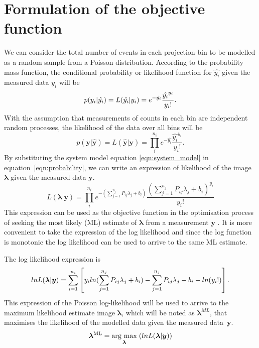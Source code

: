 \section{Formulation of the objective function}
We can consider the total number of events in each projection bin to be modelled as a random sample from a Poisson distribution. According to the probability mass function, the conditional probability or likelihood function for $\hat{y_i}$ given the measured data ${y_i}$ will be
\begin{equation}
p({y_i}|{\hat{y_i}}) = L({\hat{y_i}}|{y_i}) = e^{-\hat{y_i}} \frac{\hat{y_i}^{y_i}}{{y_i}!}  \\  .
\end{equation}
With the assumption that measurements of counts in each bin are independent random processes, the likelihood of the data over all bins will be
\begin{equation}
p(\bm{y}|\bm{\hat{y}}) = L(\bm{\hat{y}}|\bm{y}) = \prod_i^{n_i} e^{-\hat{y_i}} \frac{\hat{y_i}^{y_i}}{{y_i}!} . 
\label{eqn:probability}
\end{equation}
By substituting the system model equation \ref{eqn:system_model} in equation~\ref{eqn:probability}, we can write an expression of likelihood of the image $\bm{\lambda}$ given the measured data $\bm{y}$.
\begin{equation}
    L(\bm{\lambda}|\bm{y})  = \prod_i^{n_i} e^{-(\sum_{j=1}^{n_j} P_{ij} \lambda_j + b_{i} )} \frac{(\sum_{j=1}^{n_j} P_{ij} \lambda_j + b_{i} )^{y_i}}{{y_i}!}
\end{equation}
This expression can be used as the objective function in the optimisation process of seeking the most likely (ML) estimate of $\bm{\lambda}$ from a measurement $\bm{y}$ . 
It is more convenient to take the expression of the log likelihood and since the log function is monotonic the log likelihood can be used to arrive to the same ML estimate.

The log likelihood expression is
\begin{equation}
    lnL(\bm{\lambda}|\bm{y})  = \sum_{i=1}^{n_i}\left[ y_i ln(\sum_{j=1}^{n_j} P_{ij} \lambda_j + b_i) -\sum_{j=1}^{n_j} P_{ij} \lambda_j - b_i - ln({y_i}!) \right] \\.
\label{eqn:log_likelihood}
\end{equation}
This expression of the Poisson log-likelihood will be used to arrive to the maximum likelihood estimate image $\bm\lambda$, which will be noted as $\bm{\lambda}^{ML}$, that maximises the likelihood of the modelled data given the measured \mbox{data $\bm{y}$}. 
\begin{equation}
\bm{\lambda}^{\textrm{ML}} = \underset{\bm{\lambda}}{\operatorname{arg}\,\operatorname{max}}\;(lnL(\bm{\lambda}|\bm{y}))
\end{equation}
